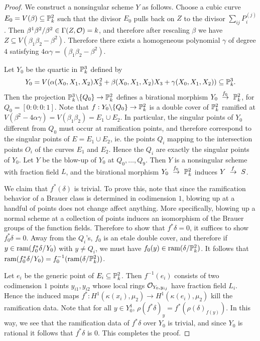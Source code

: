 \begin{proof}
We construct a nonsingular scheme $Y$ as follows.  Choose a cubic curve $E_0 = V(\beta)\subseteq \mathbb{P}^2_k$ such that the divisor $E_0$ pulls back on $Z$ to the divisor $\sum_{ij}P_i^{(j)}$.  Then $\beta^1\beta^2/\beta^2\in \Gamma(Z,\mathcal{O}) = k$, and therefore after rescaling $\beta$ we have $Z\subseteq V(\beta_1\beta_2-\beta^2)$.  Therefore there exists a homogeneous polynomial $\gamma$ of degree $4$ satisfying $4\alpha\gamma = (\beta_1\beta_2-\beta^2)$.

Let $Y_0$ be the quartic in $\mathbb{P}^3_k$ defined by
$$Y_0 = V(\alpha(X_0,X_1,X_2)X_3^2 + \beta(X_0,X_1,X_2)X_3 + \gamma(X_0,X_1,X_2))\subseteq \mathbb{P}^3_k.$$
Then the projection $\mathbb{P}^3_k\backslash\{Q_0\}\rightarrow\mathbb{P}^2_k$ defines a birational morphism $Y_0\xdashrightarrow{f_0}\bbp^2_k$, for $Q_0 = [0:0:0:1]$.  Note that $f: Y_0\backslash\{Q_0\}\rightarrow\mathbb{P}^2_k$ is a double cover of $\mathbb{P}^2_k$ ramified at $V(\beta^2-4\alpha\gamma) = V(\beta_1\beta_2) = E_1\cup E_2$.  In particular, the singular points of $Y_0$ different from $Q_0$ must occur at ramification points, and therefore correspond to the singular points of $E = E_1\cup E_2$, ie. the points $Q_i$ mapping to the intersection points $O_i$ of the curves $E_1$ and $E_2$.  Hence the $Q_i$ are exactly the singular points of $Y_0$.  Let $Y$ be the blow-up of $Y_0$ at $Q_0,\dots, Q_9$.  Then $Y$ is a nonsingular scheme with fraction field $L$, and the birational morphism $Y_0\xdashrightarrow{f_0} \bbp^2_k$ induces $Y\xdashrightarrow{f} S$.

We claim that $f^*(\delta)$ is trivial.  To prove this, note that since the ramification behavior of a Brauer class is determined in codimension $1$, blowing up at a handful of points does not change affect anything.  More specifically, blowing up a normal scheme at a collection of points induces an isomorphism of the Brauer groups of the function fields.  Therefore to show that $f^*\delta=0$, it suffices to show $f_0^*\delta=0$.  Away from the $Q_i$'s, $f_0$ is an etale double cover, and therefore if $y\in \textnormal{ram}(f_0^*\delta/Y_0)$ with $y\neq Q_i$, we must have $f_0(y)\in\textnormal{ram}(\delta/\mathbb{P}^2_k)$.  It follows that $\textnormal{ram}(f_0^*\delta/Y_0) = f_0^{-1}(\textnormal{ram}(\delta/\mathbb{P}^2_k))$.

Let $e_i$ be the generic point of $E_i\subseteq\mathbb{P}^2_k$.  Then $f^{-1}(e_i)$ consists of two codimension $1$ points $y_{i1},y_{i2}$ whose local rings $\mathcal{O}_{Y_0,y_{ij}}$ have fraction field $L_i$.  Hence the induced maps $f^*: H^1(\kappa(x_i),\mu_2)\rightarrow H^1(\kappa(e_i),\mu_2)$ kill the ramification data.  Note that for all $y\in Y_0^1$, $\rho(f^*\delta)_y = f^*(\rho(\delta)_{f(y)}).$  In this way, we see that the ramification data of $f^*\delta$ over $Y_0$ is trivial, and since $Y_0$ is rational it follows that $f^*\delta$ is $0$.  This completes the proof.
\end{proof}

